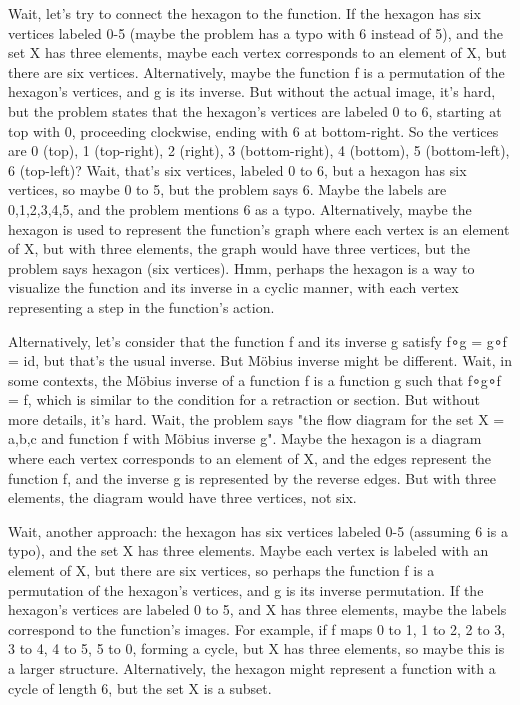 Wait, let's try to connect the hexagon to the function. If the hexagon has six vertices labeled 0-5 (maybe the problem has a typo with 6 instead of 5), and the set X has three elements, maybe each vertex corresponds to an element of X, but there are six vertices. Alternatively, maybe the function f is a permutation of the hexagon's vertices, and g is its inverse. But without the actual image, it's hard, but the problem states that the hexagon's vertices are labeled 0 to 6, starting at top with 0, proceeding clockwise, ending with 6 at bottom-right. So the vertices are 0 (top), 1 (top-right), 2 (right), 3 (bottom-right), 4 (bottom), 5 (bottom-left), 6 (top-left)? Wait, that's six vertices, labeled 0 to 6, but a hexagon has six vertices, so maybe 0 to 5, but the problem says 6. Maybe the labels are 0,1,2,3,4,5, and the problem mentions 6 as a typo. Alternatively, maybe the hexagon is used to represent the function's graph where each vertex is an element of X, but with three elements, the graph would have three vertices, but the problem says hexagon (six vertices). Hmm, perhaps the hexagon is a way to visualize the function and its inverse in a cyclic manner, with each vertex representing a step in the function's action. 

Alternatively, let's consider that the function f and its inverse g satisfy f∘g = g∘f = id, but that's the usual inverse. But Möbius inverse might be different. Wait, in some contexts, the Möbius inverse of a function f is a function g such that f∘g∘f = f, which is similar to the condition for a retraction or section. But without more details, it's hard. Wait, the problem says "the flow diagram for the set X = {a,b,c} and function f with Möbius inverse g". Maybe the hexagon is a diagram where each vertex corresponds to an element of X, and the edges represent the function f, and the inverse g is represented by the reverse edges. But with three elements, the diagram would have three vertices, not six. 

Wait, another approach: the hexagon has six vertices labeled 0-5 (assuming 6 is a typo), and the set X has three elements. Maybe each vertex is labeled with an element of X, but there are six vertices, so perhaps the function f is a permutation of the hexagon's vertices, and g is its inverse permutation. If the hexagon's vertices are labeled 0 to 5, and X has three elements, maybe the labels correspond to the function's images. For example, if f maps 0 to 1, 1 to 2, 2 to 3, 3 to 4, 4 to 5, 5 to 0, forming a cycle, but X has three elements, so maybe this is a larger structure. Alternatively, the hexagon might represent a function with a cycle of length 6, but the set X is a subset. 


